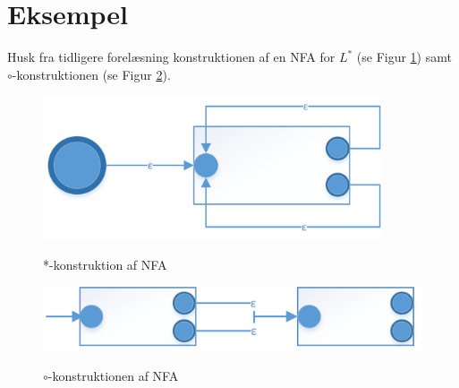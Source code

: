 \documentclass[a4paper,10pt,article]{memoir}
\begin{document}
\section{Eksempel}

Husk fra tidligere forelæsning konstruktionen af en NFA for $L^*$ (se
Figur \ref{fig:fig2}) samt $\circ$-konstruktionen (se Figur
\ref{fig:fig3}).

\begin{figure}[H]%
{\centering 
\includegraphics[width=100mm]{Fig2x.png}
}
\caption{*-konstruktion af NFA}
\label{fig:fig2}
\end{figure}

\begin{figure}[H]%
{\centering 
\includegraphics[width=\textwidth]{Fig3x.png}
}
\caption{$\circ$-konstruktionen af NFA}
\label{fig:fig3}
\end{figure}
\end{document}

